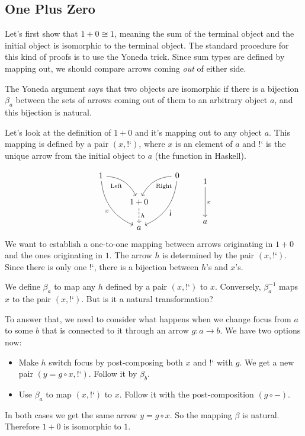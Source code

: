 \documentclass[DaoFP]{subfiles}
\begin{document}
\subsection{One Plus Zero}
Let's first show that $1 + 0 \cong 1$, meaning the sum of the terminal object and the initial object is isomorphic to the terminal object. The standard procedure for this kind of proofs is to use the Yoneda trick. Since sum types are defined by mapping out, we should compare arrows coming \emph{out} of either side. 

The Yoneda argument says that two objects are isomorphic if there is a bijection $\beta_a$ between the sets of arrows coming out of them to an arbitrary object $a$, and this bijection is natural.  
 
Let's look at the definition of $1 + 0$ and it's mapping out to any object $a$. This mapping is defined by a pair $(x, \mbox{!`})$, where $x$ is an element of $a$ and $\mbox{!`}$ is the unique arrow from the initial object to $a$ (the  function in Haskell). 

\[
 \begin{tikzcd}
 1
 \arrow[dr,  bend left, "\text{Left}"']
 \arrow[ddr, bend right, "x"']
 && 0
 \arrow[dl, bend right, "\text{Right}"]
 \arrow[ddl, bend left, "\mbox{!`}"]
 \\
&1 + 0
\arrow[d, dashed, "h"]
\\
& a
 \end{tikzcd}
 \qquad
 \begin{tikzcd}
 1
 \arrow[dd, "x"]
 \\
 \\
 a
 \end{tikzcd}
\]
We want to establish a one-to-one mapping between arrows originating in $1+0$ and the ones originating in $1$. The arrow $h$ is determined by the pair $(x, \mbox{!`})$. Since there is only one $\mbox{!`}$, there  is a bijection between $h$'s and $x$'s. 

We define $\beta_a$ to map any $h$ defined by a pair $(x, \mbox{!`})$ to $x$. Conversely, $\beta^{-1}_a$ maps $x$ to the pair $(x, \mbox{!`})$. But is it a natural transformation? 

To answer that, we need to consider what happens when we change focus from $a$ to some $b$ that is connected to it through an arrow $g \colon a \to b$. We have two options now:
\begin{itemize}
\item Make $h$ switch focus by post-composing both $x$ and $\mbox{!`}$ with $g$. We get a new pair $(y = g \circ x, \mbox{!`})$. Follow it by $\beta_b$.
\item Use $\beta_a$ to map $(x, \mbox{!`})$ to $x$. Follow it with the post-composition $(g \circ -)$. 
\end{itemize}
In both cases we get the same arrow $y = g \circ x$. So the mapping $\beta$ is natural. Therefore $1 + 0$ is isomorphic to $1$.
\end{document}
